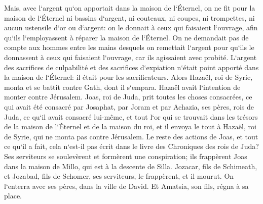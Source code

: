 \verse Mais, avec l`argent qu`on apportait dans la maison de l`Éternel, on ne fit pour la maison de l`Éternel ni bassins d`argent, ni couteaux, ni coupes, ni trompettes, ni aucun ustensile d`or ou d`argent: 
\verse on le donnait à ceux qui faisaient l`ouvrage, afin qu`ils l`employassent à réparer la maison de l`Éternel. 
\verse On ne demandait pas de compte aux hommes entre les mains desquels on remettait l`argent pour qu`ils le donnassent à ceux qui faisaient l`ouvrage, car ils agissaient avec probité. 
\verse L`argent des sacrifices de culpabilité et des sacrifices d`expiation n`était point apporté dans la maison de l`Éternel: il était pour les sacrificateurs. 
\verse Alors Hazaël, roi de Syrie, monta et se battit contre Gath, dont il s`empara. Hazaël avait l`intention de monter contre Jérusalem. 
\verse Joas, roi de Juda, prit toutes les choses consacrées, ce qui avait été consacré par Josaphat, par Joram et par Achazia, ses pères, rois de Juda, ce qu`il avait consacré lui-même, et tout l`or qui se trouvait dans les trésors de la maison de l`Éternel et de la maison du roi, et il envoya le tout à Hazaël, roi de Syrie, qui ne monta pas contre Jérusalem. 
\verse Le reste des actions de Joas, et tout ce qu`il a fait, cela n`est-il pas écrit dans le livre des Chroniques des rois de Juda? 
\verse Ses serviteurs se soulevèrent et formèrent une conspiration; ils frappèrent Joas dans la maison de Millo, qui est à la descente de Silla. 
\verse Jozacar, fils de Schimeath, et Jozabad, fils de Schomer, ses serviteurs, le frappèrent, et il mourut. On l`enterra avec ses pères, dans la ville de David. Et Amatsia, son fils, régna à sa place. 

